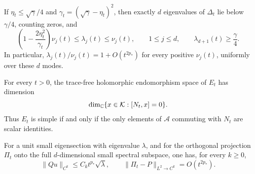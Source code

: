 \begin{theorem}\label{thm:matrix-relative}
If $\eta_t\le\sqrt\gamma/4$ and
$\gamma_t=(\sqrt\gamma-\eta_t)^2$, then exactly $d$ eigenvalues of
$\Delta_t$ lie below $\gamma/4$, counting zeros, and
\begin{equation}\label{eq:matrix-relative}
 \left(1-\frac{2\eta_t^2}{\gamma_t}\right)\nu_j(t)
 \le\lambda_j(t)\le\nu_j(t),\qquad 1\le j\le d,
 \qquad \lambda_{d+1}(t)\ge\frac\gamma4.
\end{equation}
In particular, $\lambda_j(t)/\nu_j(t)=1+O(t^{2p_*})$ for every
positive $\nu_j(t)$, uniformly over these $d$ modes.

For every $t>0$, the trace-free holomorphic endomorphism space of
$E_t$ has dimension
\begin{equation}\label{eq:matrix-centralizer}
 \dim_\mathbb C\{x\in\mathcal K:[N_t,x]=0\}.
\end{equation}
Thus $E_t$ is simple if and only if the only elements of $\mathcal A$
commuting with $N_t$ are scalar identities.

For a unit small eigensection with eigenvalue $\lambda$, and for the
orthogonal projection $\Pi_t$ onto the full $d$-dimensional small
spectral subspace, one has, for every $k\ge0$,
\begin{equation}\label{eq:matrix-convergence}
 \lVert Qu\rVert_{C^k}\le C_k t^{p_*}\sqrt\lambda,
 \qquad
 \lVert\Pi_t-P\rVert_{L^2\to C^k}=O(t^{2p_*}).
\end{equation}
\end{theorem}

